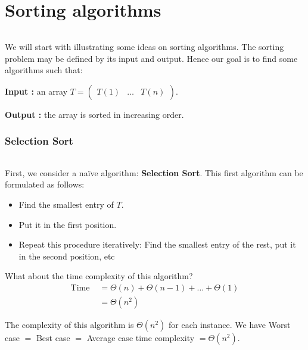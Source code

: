

\part{Sorting algorithms}

\paragraph{}
We will start with illustrating some ideas on sorting algorithms. The sorting problem may be defined by its input and output. Hence our goal is to find some algorithms such that: \newline

\textbf{Input :} an array $T = \begin{pmatrix}T(1) & \ldots & T(n) \end{pmatrix}$. 

\textbf{Output :} the array is sorted in increasing order. 


\section{Selection Sort}

\paragraph{}
First, we consider a naïve algorithm: \textbf{Selection Sort}. This first algorithm can be formulated as follows:

\begin{itemize}
\renewcommand{\labelitemi}{$\bullet$}
	\item Find the smallest entry of $T$.
	\item Put it in the first position.	
	\item Repeat this procedure iteratively: Find the smallest entry of the rest, put it in the second position, etc
\end{itemize}

What about the time complexity of this algorithm? \\
\begin{align*}
\text{Time } &= \Theta(n) + \Theta(n-1) + \ldots + \Theta(1) \\
& = \Theta(n^2)
\end{align*}

\begin{remark}
The complexity of this algorithm is $\Theta(n^2)$ for each instance. We have Worst case $=$ Best case $=$ Average case time complexity $= \Theta(n^2)$.
\end{remark}

